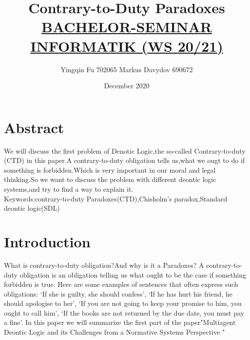 \documentclass{article}
\title{Contrary-to-Duty Paradoxes\\{\normalsize  \underline{BACHELOR-SEMINAR INFORMATIK  (WS 20/21)}}}
\author{Yingqin Fu 702065 Markus Davydov 690672 }
\date{December 2020}
\begin{document}
\maketitle

\tableofcontents
\section*{Abstract}
We will discuss the first problem of Denotic Logic,the so-called Contrary-to-duty (CTD) in this paper.A contrary-to-duty obligation tells us,what we ougt to do if something is forbidden.Which is very important in our moral and legal thinking.So we want to discuss the problem with different deontic logic systems,and try to find a way to explain it.\\
Keywords:contrary-to-duty Paradoxes(CTD),Chisholm’s paradox,Standard deontic logic(SDL)
\section*{Introduction}
What is contrary-to-duty obligation?And why is it a Paradoxes? A contrary-to-duty obligation is an obligation telling us what ought to be the case if something forbidden is true. Here are some examples of sentences that often express such obligations: ‘If she is guilty, she should confess’, ‘If he has hurt his friend, he should apologise to her’, ‘If you are not going to keep your promise to him, you ought to call him’, ‘If the books are not returned by the due date, you must pay a fine’. In this paper we will summarize the first part of the paper"Multiagent Deontic Logic and its Challenges from a Normative Systems Perspective "\cite{1} 
\end{document}
